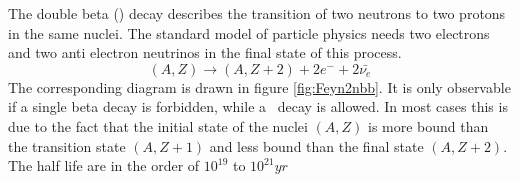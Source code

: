 \documentclass[encoding=utf8,british]{tumphthesis}
\begin{document}
The double beta (\twonu) decay describes the transition of two neutrons to two protons in the same nuclei.
The standard model of particle physics needs two electrons and two anti electron neutrinos in the final state of this process.
\begin{equation}
(A,Z)\rightarrow (A,Z+2) + 2e^- + 2\bar{\nu_e}
\end{equation} 
The corresponding diagram is drawn in figure \ref{fig:Feyn2nbb}.
It is only observable if a single beta decay is forbidden, while a \twonu\ decay is allowed.
In most cases this is due to the fact that the initial state of the nuclei $(A,Z)$ is more bound than the transition state $(A,Z+1)$ and less bound than the final state $(A,Z+2)$.
The half life are in the order of $10^{19}$ to $10^{21} \unit{yr}$
\\
\end{document}
